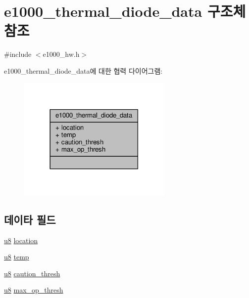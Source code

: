 \hypertarget{structe1000__thermal__diode__data}{}\section{e1000\+\_\+thermal\+\_\+diode\+\_\+data 구조체 참조}
\label{structe1000__thermal__diode__data}


{\ttfamily \#include $<$e1000\+\_\+hw.\+h$>$}



e1000\+\_\+thermal\+\_\+diode\+\_\+data에 대한 협력 다이어그램\+:
\nopagebreak
\begin{figure}[H]
\begin{center}
\leavevmode
\includegraphics[width=213pt]{structe1000__thermal__diode__data__coll__graph}
\end{center}
\end{figure}
\subsection*{데이타 필드}
\begin{DoxyCompactItemize}
\item 
\hyperlink{lib_2igb_2e1000__osdep_8h_a8baca7e76da9e0e11ce3a275dd19130c}{u8} \hyperlink{structe1000__thermal__diode__data_a8022b2caf1f3855a19b16faf4c9cd43d}{location}
\item 
\hyperlink{lib_2igb_2e1000__osdep_8h_a8baca7e76da9e0e11ce3a275dd19130c}{u8} \hyperlink{structe1000__thermal__diode__data_ae0825a9338b7ba9f7c2c39dd6870254d}{temp}
\item 
\hyperlink{lib_2igb_2e1000__osdep_8h_a8baca7e76da9e0e11ce3a275dd19130c}{u8} \hyperlink{structe1000__thermal__diode__data_a4075977884f97fa79135799050221023}{caution\+\_\+thresh}
\item 
\hyperlink{lib_2igb_2e1000__osdep_8h_a8baca7e76da9e0e11ce3a275dd19130c}{u8} \hyperlink{structe1000__thermal__diode__data_a83c0353949e3a2fd5cec2d8da933c21f}{max\+\_\+op\+\_\+thresh}
\end{DoxyCompactItemize}


